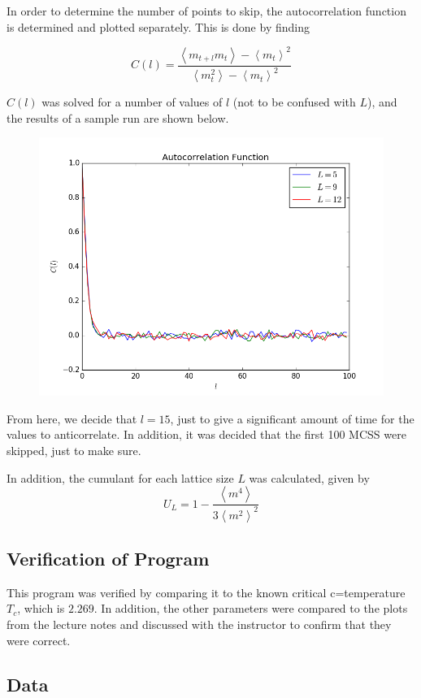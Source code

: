 \documentclass[10pt,letter]{article}
\begin{document}
In order to determine the number of points to skip, the autocorrelation function is determined and plotted separately. This is done by finding

$$C(l) = \frac{\left\langle m_{t+l}m_{t} \right\rangle - \left\langle m_{t}\right\rangle^2  }{\left\langle m^2_{t}\right\rangle - \left\langle m_{t}\right\rangle^2} $$

$C(l)$ was solved for a number of values of $l$ (not to be confused with $L$), and the results of a sample run are shown below.

\begin{figure}[H]
  \centering
    \includegraphics[width=.6\textwidth]{homework9_problem2_plot0}
\end{figure}

From here, we decide that $l=15$, just to give a significant amount of time for the values to anticorrelate. In addition, it was decided that the first 100 MCSS were skipped, just to make sure.

In addition, the cumulant for each lattice size $L$ was calculated, given by
$$ U_L = 1-\frac{\left< m^4 \right>}{3\left< m^2 \right>^2}$$

\subsection{Verification of Program}

This program was verified by comparing it to the known critical c=temperature $T_c$, which is $2.269$. In addition, the other parameters were compared to the plots from the lecture notes and discussed with the instructor to confirm that they were correct.

\subsection{Data}
\end{document}
